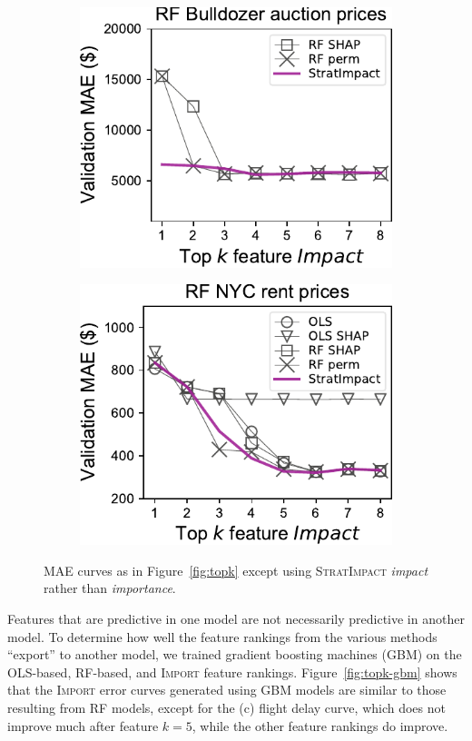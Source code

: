 \documentclass[11pt]{article}
\newcommand{\figref}[1]{Figure~\ref{#1}}
\newcommand{\Impo}{\fontfamily{cmr}\textsc{Import}}
\newcommand{\simp}{\fontfamily{cmr}\textsc{\small StratImpact}}
\begin{document}
\begin{figure}
\begin{subfigure}{.245\textwidth}
\includegraphics[scale=0.45]{images/bulldozer-topk-RF-Impact.pdf}
\subcaption{}
\end{subfigure}%
\hfill
\begin{subfigure}{.245\textwidth}
    \centering
\includegraphics[scale=0.45]{images/rent-topk-RF-Impact.pdf}
\subcaption{}
\end{subfigure}
\caption[short]{\small MAE curves as in \figref{fig:topk} except using \simp{} {\em impact} rather than {\em importance}.}
\label{fig:topk-impact}
\end{figure}

Features that are predictive in one model are not necessarily predictive in another model.  To determine how well the feature rankings from the various methods ``export'' to another model, we trained gradient boosting machines (GBM) on the OLS-based, RF-based, and \Impo{} feature rankings.  \figref{fig:topk-gbm} shows that the \Impo{} error curves generated using GBM models are similar to those resulting from RF models, except for the (c) flight delay curve, which does not improve much after feature $k=5$, while the other feature rankings do improve. 
\end{document}
